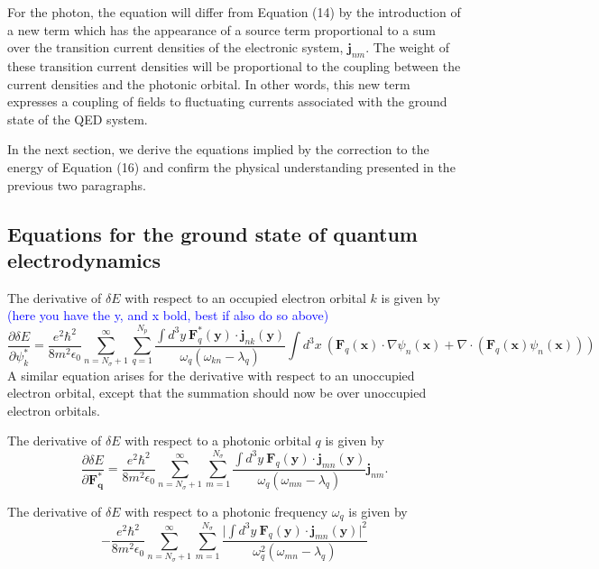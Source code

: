 \documentclass[aps,prb,onecolumn,preprint,
	groupedaddress,superscriptaddress,
	amsfonts,amssymb,amsmath,floatfix,
	citeautoscript]{revtex4-1}
\newcommand{\Jadd}[1]{\textcolor{blue}{#1}}
\begin{document}
For the photon, the equation will differ from Equation (14) by the introduction of a new term which has the appearance of a source term proportional to a sum over the transition current densities of the electronic system, $\mathbf{j}_{nm}$. The weight of these transition current densities will be proportional to the coupling between the current densities and the photonic orbital. In other words, this new term expresses a coupling of fields to fluctuating currents associated with the ground state of the QED system. 

In the next section, we derive the equations implied by the correction to the energy of Equation (16) and confirm the physical understanding presented in the previous two paragraphs.

\subsection{Equations for the ground state of quantum electrodynamics}

The derivative of $\delta E$ with respect to an occupied electron orbital $k$ is given by \Jadd{(here you have the y, and x bold, best if also do so above)}
\begin{equation}
\frac{\partial\delta E}{\partial \psi_k^*} = \frac{e^2\hbar^2}{8m^2\epsilon_0}\sum\limits_{n=N_{\sigma}+1}^{\infty}\sum\limits_{q=1}^{N_p} \frac{\int d^3y~\mathbf{F}^*_q(\mathbf{y})\cdot\mathbf{j}_{nk}(\mathbf{y})}{\omega_q(\omega_{kn}-\lambda_q)}\int d^3x~\left( \mathbf{F}_q(\mathbf{x})\cdot\nabla\psi_n(\mathbf{x}) + \nabla\cdot(\mathbf{F}_q(\mathbf{x})\psi_n(\mathbf{x}))\right)
\end{equation}
A similar equation arises for the derivative with respect to an unoccupied electron orbital, except that the summation should now be over unoccupied electron orbitals.

The derivative of $\delta E$ with respect to a photonic orbital $q$ is given by
\begin{equation}
\frac{\partial\delta E}{\partial \mathbf{F_q^*}}=\frac{e^2\hbar^2}{8m^2\epsilon_0}\sum\limits_{n=N_{\sigma}+1}^{\infty}\sum\limits_{m=1}^{N_{\sigma}} \frac{\int d^3y~\mathbf{F}_q(\mathbf{y})\cdot \mathbf{j}_{mn}(\mathbf{y})}{\omega_q(\omega_{mn}-\lambda_q)}\mathbf{j}_{nm}.
\end{equation}

The derivative of $\delta E$ with respect to a photonic frequency $\omega_q$ is given by
\begin{equation}
-\frac{e^2\hbar^2}{8m^2\epsilon_0}\sum\limits_{n=N_{\sigma}+1}^{\infty}\sum\limits_{m=1}^{N_{\sigma}}\frac{\Big|\int d^3y~\mathbf{F}_q(\mathbf{y})\cdot\mathbf{j}_{mn}(\mathbf{y})\Big|^2}{\omega_q^2(\omega_{mn}-\lambda_q)}
\end{equation}
\end{document}
